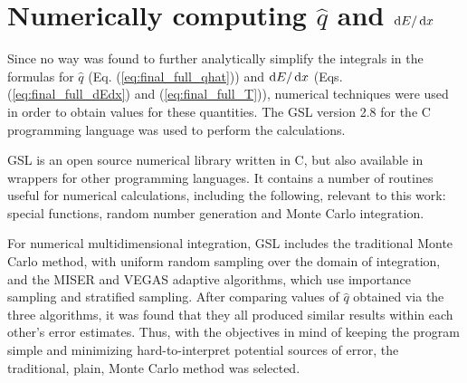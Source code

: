 \section{Numerically computing $\hat{q}$ and $\mathop{}\!\mathrm{d} E / \mathop{}\!\mathrm{d} x$}
\label{sec:numerical_computation}

Since no way was found to further analytically simplify the integrals in the formulas for $\hat{q}$ (Eq. (\ref{eq:final_full_qhat})) and $\mathop{}\!\mathrm{d} E / \mathop{}\!\mathrm{d} x$ (Eqs. (\ref{eq:final_full_dEdx}) and (\ref{eq:final_full_T})), numerical techniques were used in order to obtain values for these quantities. The \gls{GSL} \cite{gsl} version 2.8 for the C programming language was used to perform the calculations. 

\gls{GSL} is an open source numerical library written in C, but also available in wrappers for other programming languages. It contains a number of routines useful for numerical calculations, including the following, relevant to this work: special functions, random number generation and Monte Carlo integration.

For numerical multidimensional integration, \gls{GSL} includes the traditional Monte Carlo method, with uniform random sampling over the domain of integration, and the MISER and VEGAS adaptive algorithms, which use importance sampling and stratified sampling. After comparing values of $\hat{q}$ obtained via the three algorithms, it was found that they all produced similar results within each other's error estimates. Thus, with the objectives in mind of keeping the program simple and minimizing hard-to-interpret potential sources of error, the traditional, plain, Monte Carlo method was selected.



